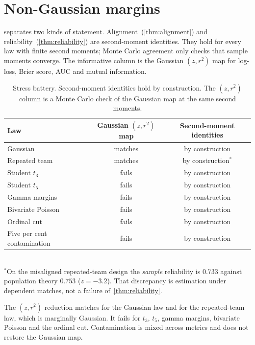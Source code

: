 \section{Non-Gaussian margins}
\label{sec:stress}

 separates two kinds of statement.
Alignment~(\cref{thm:alignment}) and reliability~(\cref{thm:reliability}) are second-moment identities.
They hold for every law with finite second moments; Monte Carlo agreement only checks that sample moments converge.
The informative column is the Gaussian $(z,r^2)$ map for log-loss, Brier score, AUC and mutual information.

\begin{table}[t]
  \centering
  \caption{Stress battery.
           Second-moment identities hold by construction.
           The $(z,r^2)$ column is a Monte Carlo check of the Gaussian map at the same second moments.}
  \label{tab:stress}
  \begin{tabular}{@{}lcc@{}}
    \toprule
    Law & Gaussian $(z,r^2)$ map & Second-moment identities \\
    \midrule
    Gaussian            & matches & by construction \\
    Repeated team       & matches & by construction$^\ast$ \\
    Student $t_3$       & fails   & by construction \\
    Student $t_5$       & fails   & by construction \\
    Gamma margins       & fails   & by construction \\
    Bivariate Poisson   & fails   & by construction \\
    Ordinal cut         & fails   & by construction \\
    Five per cent contamination & fails & by construction \\
    \bottomrule
  \end{tabular}\\[0.5em]
  {\footnotesize $^\ast$On the misaligned repeated-team design the \emph{sample} reliability is $0.733$ against population theory $0.753$ ($z=-3.2$).
   That discrepancy is estimation under dependent matches, not a failure of~\cref{thm:reliability}.}
\end{table}

The $(z,r^2)$ reduction matches for the Gaussian law and for the repeated-team law, which is marginally Gaussian.
It fails for $t_3$, $t_5$, gamma margins, bivariate Poisson and the ordinal cut.
Contamination is mixed across metrics and does not restore the Gaussian map.

